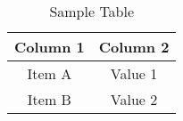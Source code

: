 \begin{table}[htbp]
  \centering
  \caption{Sample Table}
  \label{tab:sample-table}
  \begin{tabular}{|c|c|}
    \hline
    Column 1 & Column 2 \\
    \hline
    Item A   & Value 1  \\
    Item B   & Value 2  \\
    \hline
  \end{tabular}
\end{table}
